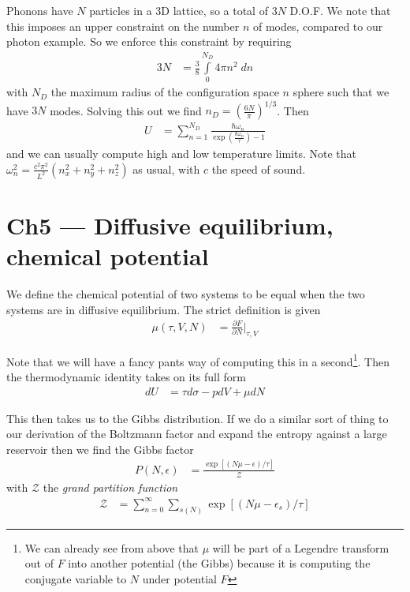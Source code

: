 \documentclass[10pt,twocolumn]{article}
\newcommand{\pd}[2]{\frac{\partial#1}{\partial#2}}
\begin{document}
Phonons have $N$ particles in a 3D lattice, so a total of $3N$ D.O.F. We note that this imposes an upper constraint on the number $n$ of modes, compared to our photon example. So we enforce this constraint by requiring
\begin{align}
    3N &= \frac{3}{8}\int\limits_{0}^{N_D}4\pi n^2\;dn
\end{align}
with $N_D$ the maximum radius of the configuration space $n$ sphere such that we have $3N$ modes. Solving this out we find $n_D = \left( \frac{6N}{\pi} \right)^{1/3}$. Then
\begin{align}
    U &= \sum\limits_{n=1}^{N_D} \frac{\hbar \omega_n}{\exp\left( \frac{\hbar \omega_n}{\tau} \right) - 1}
\end{align}
and we can usually compute high and low temperature limits. Note that $\omega_n^2 = \frac{c^2 \pi^2}{L^2}\left( n_x^2 + n_y^2 + n_z^2 \right)$ as usual, with $c$ the speed of sound.

\section{Ch5 --- Diffusive equilibrium, chemical potential}

We define the chemical potential of two systems to be equal when the two systems are in diffusive equilibrium. The strict definition is given
\begin{align}
    \mu(\tau,V,N) &= \pd{F}{N}\Bigg|_{\tau,V}
\end{align}

Note that we will have a fancy pants way of computing this in a second\footnote{We can already see from above that $\mu$ will be part of a Legendre transform out of $F$ into another potential (the Gibbs) because it is computing the conjugate variable to $N$ under potential $F$}. Then the thermodynamic identity takes on its full form
\begin{align}
    dU &= \tau d\sigma - pdV + \mu dN
\end{align}

This then takes us to the Gibbs distribution. If we do a similar sort of thing to our derivation of the Boltzmann factor and expand the entropy against a large reservoir then we find the Gibbs factor
\begin{align}
    P(N,\epsilon) &= \frac{\exp\left[ \left( N\mu - \epsilon \right)/\tau \right]}{\mathcal{Z}}
\end{align}
with $\mathcal{Z}$ the \emph{grand partition function}
\begin{align}
    \mathcal{Z} &= \sum\limits_{n=0}^{\infty}\sum\limits_{s(N)}^{}\exp\left[ \left( N\mu - \epsilon_s \right)/\tau \right]
\end{align}
\end{document}
